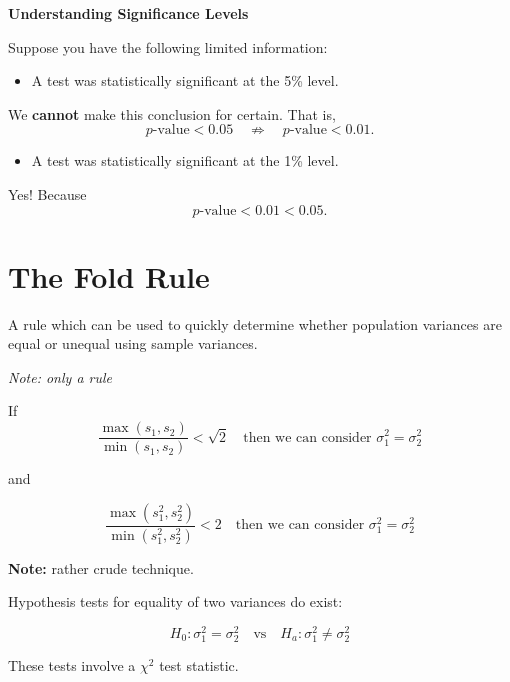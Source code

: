 \textbf{Understanding Significance Levels}

Suppose you have the following limited information:

\begin{itemize}
    \item A test was statistically significant at the 5\% level.
\end{itemize}
    
We \textbf{cannot} make this conclusion for certain. That is, 
    \[
    p\text{-value} < 0.05 \quad \not\Rightarrow \quad p\text{-value} < 0.01.
    \]
\begin{itemize}
\item A test was statistically significant at the 1\% level.
\end{itemize}
    
  Yes! Because
    \[
    p\text{-value} < 0.01 < 0.05.
    \]


\section{The Fold Rule}

A rule which can be used to quickly determine whether population variances are equal or unequal using sample variances.

\textit{Note: only a rule}

\medskip

If 
\[
\frac{\max(s_1, s_2)}{\min(s_1, s_2)} < \sqrt{2} 
\quad \text{then we can consider } \sigma_1^2 = \sigma_2^2
\]

and

\[
\frac{\max(s_1^2, s_2^2)}{\min(s_1^2, s_2^2)} < 2 
\quad \text{then we can consider } \sigma_1^2 = \sigma_2^2
\]

\medskip

\textbf{Note:} rather crude technique.

Hypothesis tests for equality of two variances do exist:

\[
H_0: \sigma_1^2 = \sigma_2^2 \quad \text{vs} \quad H_a: \sigma_1^2 \neq \sigma_2^2
\]

These tests involve a \(\chi^2\) test statistic.
